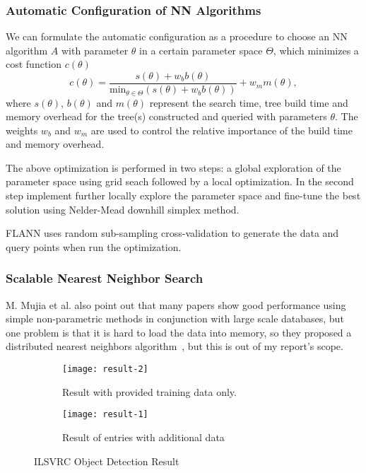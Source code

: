 \documentclass[12pt]{article}
\begin{document}
\subsubsection{Automatic Configuration of NN Algorithms}
We can formulate the automatic configuration as a procedure to choose an NN algorithm $A$ with parameter $\theta$ in a certain parameter space $\Theta$, which minimizes a cost function $c(\theta)$
\begin{equation}
c(\theta) = \frac{s(\theta)+w_bb(\theta)}{\mbox{min}_{\theta \in \Theta}(s(\theta)+w_bb(\theta))}+w_mm(\theta),
\end{equation}
where $s(\theta)$, $b(\theta)$ and $m(\theta)$ represent the search time, tree build time and memory overhead for the tree(s) constructed and queried with parameters $\theta$. The weights $w_b$ and $w_m$ are used to control the relative importance of the build time and memory overhead.
 
 The above optimization is performed in two steps: a global exploration of the parameter space using grid seach followed by a local optimization. In the second step implement further locally explore the parameter space and fine-tune the best solution using Nelder-Mead downhill simplex method.
 
 FLANN uses random sub-sampling cross-validation to generate the data and query points when run the optimization.
\subsubsection{Scalable Nearest Neighbor Search}
M. Mujia et al. also point out that many papers show good performance using simple non-parametric methods in conjunction with large scale databases, but one problem is that it is hard to load the data into memory, so they proposed a distributed nearest neighbors algorithm~\citep{flann_pami_2014}, but this is out of my report's scope.

\begin{figure}
\centering
\begin{subfigure}[hb]{0.7\textwidth}
\texttt{[image: result-2]}
\caption{Result with provided training data only.}
\label{fig:10-0}
\end{subfigure}
\hfill
\begin{subfigure}[hb]{0.7\textwidth}
\texttt{[image: result-1]}
\caption{Result of entries with additional data}
\label{fig:10-2}
\end{subfigure}
\caption{ILSVRC Object Detection Result~\citep{imgenetResult}}\label{f11}
\end{figure}
\end{document}
